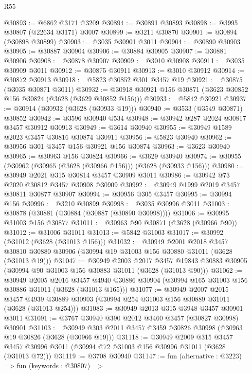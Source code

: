 \begin{lexlean}{R55}
\begin{coremodule}
@30893 := @6862 @3171 @3209
@30894 := @30891 @30893
@30898 := @3995 @30807 (@22634 @3171) @3007
@30899 := @3211 @30870
@30901 := @30894 (@30898 @30899)
@30903 := @3035 @30901 @3011
@30904 := @30890 @30903
@30905 := @30887 @30904
@30906 := @30884 @30905
@30907 := @30881 @30906
@30908 := @30878 @30907
@30909 := @3010 @30908
@30911 := @3035 @30909 @3011
@30912 := @30875 @30911
@30913 := @3010 @30912
@30914 := @30872 @30913
@30918 := @5823 @30852 @301 @3457 @19
@30921 := @30875 (@3035 @30871 @3011)
@30932 := @30918 @30921 @156 @30871 (@3623 @30852 @156 @30824 (@3628 (@3629 @30852 @156)))
@30933 := @5842 @30921
@30937 := @30914 (@30932 (@3628 (@30933 @19)))
@30940 := @3533 (@3549 @30871) @30852
@30942 := @3596 @30940 @534
@30948 := @30942 @287 @2024 @30817 @3457 @30912 @30913
@30949 := @3614 @30940
@30955 := @30949 @1589 @2023 @3457 @30816 @30874 @30911
@30956 := @5823 @30940
@30962 := @30956 @301 @3457 @156 @30921 @156 @30874
@30963 := @3623 @30940
@30965 := @30963 @156 @30824
@30966 := @3629 @30940
@30974 := @30955 (@30962 (@30965 (@3628 (@30966 @156))) (@3628 (@30933 @156)))
@30980 := @30949 @2021 @315 @30814 @3457 @30909 @3011
@30986 := @30942 @73 @2020 @30812 @3457 @30908 @30909
@30992 := @30949 @1999 @2019 @3457 @30811 @30877 @30907
@30994 := @30956 @305 @3457
@30995 := @30994 @156
@30996 := @3210 @30899
@30998 := @3035 @30996 @3011
@31003 := @30878 (@30881 (@30884 (@30887 (@30890 @30998))))
@31006 := @30995 @31003 @156 @30877
@31011 := @30963 @90 @30871 (@3628 (@30966 @90))
@31012 := @31006 @31011
@31013 := @5842 @31003
@31017 := @30992 (@31012 (@3628 (@31013 @156)))
@31032 := @30949
    @2001
    @2018
    @3457
    @30810
    @30880
    @30906
    (@30994 @19 @31003 @156 @30880 @31011 (@3628 (@31013 @19)))
@31047 := @30949
    @2003
    @2017
    @3457
    @19843
    @30883
    @30905
    (@30994 @90 @31003 @156 @30883 @31011 (@3628 (@31013 @90)))
@31062 := @30949
    @2005
    @2016
    @3457
    @4940
    @30886
    @30904
    (@30994 @165 @31003 @156 @30886 @31011 (@3628 (@31013 @165)))
@31077 := @30949
    @2007
    @2015
    @3457
    @4939
    @30889
    @30903
    (@30994 @254 @31003 @156 @30889 @31011 (@3628 (@31013 @254)))
@31083 := @30949 @2013 @315 @3948 @3457 @30901 @3011
@31091 := @3767 @30940 @390 @2012 @3460 @3457 (@30827 @30998) @30901
@31103 := @30949 @303 @2011 @3457 @3459 @30826 @30998 (@30963 @19 @30826 (@3628 (@30966 @19)))
@31118 := @30949
    @2009
    @315
    @3457
    @3457
    @30996
    @3011
    (@30994 @72 @31003 @156 @30996 @31011 (@3628 (@31013 @72)))
@31119 := @3708 @30940
@31147 := fun (alternative : @3223) =>
  fun (keywords : @30807) =>

\end{coremodule}
\end{lexlean}
